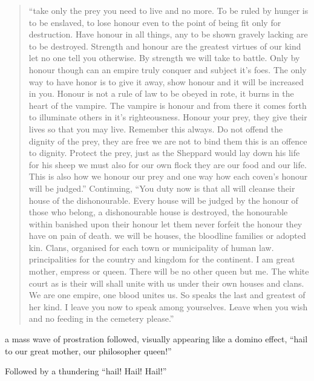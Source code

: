 \begin{quotation}
	``take only the prey you need to live and no more. To be ruled by hunger is to be enslaved, to lose honour even to the point of being fit only for destruction. Have honour in all things, any to be shown gravely lacking are to be destroyed. Strength and honour are the greatest virtues of our kind let no one tell you otherwise. By strength we will take to battle. Only by honour though can an empire truly conquer and subject it's foes. The only way to have honor is to give it away, show honour and it will be increased in you. Honour is not a rule of law to be obeyed in rote, it burns in the heart of the vampire. The vampire is honour and from there it comes forth to illuminate others in it's righteousness. Honour your prey, they give their lives so that you may live. Remember this always. Do not offend the dignity of the prey, they are free we are not to bind them this is an offence to dignity. Protect the prey, just as the Sheppard would lay down his life for his sheep we must also for our own flock they are our food and our life. This is also how we honour our prey and one way how each coven's honour will be judged.''
	Continuing, ``You duty now is that all will cleanse their house of the dishonourable. Every house will be judged  by the honour of those who belong, a dishonourable house is destroyed, the honourable within banished upon their honour let them never forfeit the honour they have on pain of death. we will be houses, the bloodline families or adopted kin. Clans, organised for each town or municipality of human law. principalities for the country and kingdom for the continent. I am great mother, empress or queen. There will be no other queen but me. The white court as is their will shall unite with us under their own houses and clans. We are one empire, one blood unites us. So speaks the last and greatest of her kind. I leave you now to speak among yourselves. Leave when you wish and no feeding in the cemetery please.''
\end{quotation}

a mass wave of prostration followed, visually appearing like a domino effect, ``hail to our great mother, our philosopher queen!'' 

Followed by a thundering ``hail! Hail! Hail!'' 

